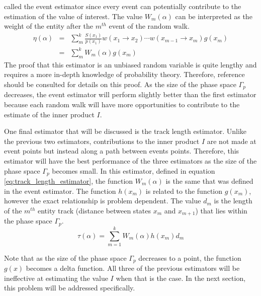 called the event estimator since every event can potentially contribute to the 
estimation of the value of interest. The value $W_m(\alpha)$ can be interpreted 
as the weight of the entity after the $m^{th}$ event of the random walk.
\begin{eqnarray}
  \eta(\alpha) & = & \sum_m^k \frac{S(x_1)}{p(x_1)}w(x_1 \to x_2) \cdots 
  w(x_{m-1} \to x_m) g(x_m) \nonumber \\
  & = & \sum_m^k W_m(\alpha) g(x_m)
  \label{eq:collision_estimator_2}
\end{eqnarray}
The proof that this estimator is an unbiased random variable is quite lengthy 
and requires a more in-depth knowledge of probability theory. Therefore, 
reference \cite{spanier_monte_1969} should be consulted for details on this 
proof. As the size of the phase space $\Gamma_p$ decreases, the event estimator 
will perform slightly better than the first estimator because each random walk 
will have more opportunities to contribute to the estimate of the inner product
$I$. 

One final estimator that will be discussed is the track length estimator.
Unlike the previous two estimators, contributions to the inner product $I$
are not made at event points but instead along a path between events points.
Therefore, this estimator will have the best performance of the three
estimators as the size of the phase space $\Gamma_p$ becomes small. In this 
estimator, defined in equation \ref{eq:track_length_estimator}, the function 
$W_m(\alpha)$ is the same that was defined in the event estimator. The function 
$h(x_m)$ is related to the function $g(x_m)$, however the exact relationship is 
problem dependent. The value $d_m$ is the length of the $m^{th}$ entity track 
(distance between states $x_m$ and $x_{m+1}$) that lies within the phase space 
$\Gamma_p$.
\begin{equation}
  \tau(\alpha) = \sum_{m=1}^k W_m(\alpha)h(x_m)d_m
  \label{eq:track_length_estimator}
\end{equation}

Note that as the size of the phase space $\Gamma_p$ decreases to a point, the 
function $g(x)$ becomes a delta function. All three of the previous estimators 
will be ineffective at estimating the value $I$ when that is the case. In the 
next section, this problem will be addressed specifically.

